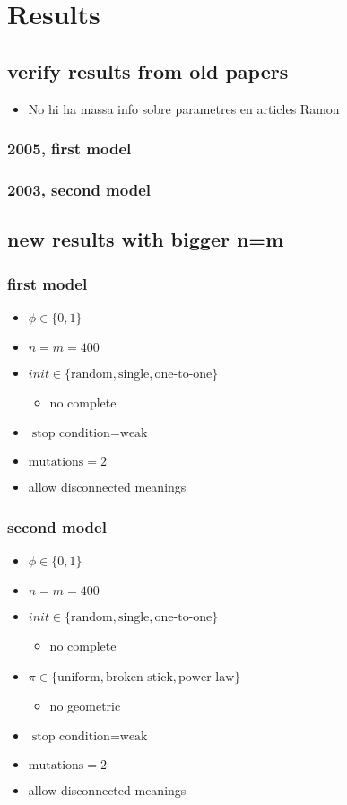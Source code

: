 \chapter{Results}
\section{verify results from old papers}
\begin{itemize}
\item No hi ha massa info sobre parametres en articles Ramon
\end{itemize}
\subsection{2005, first model}
\subsection{2003, second model}
\section{new results with bigger n=m}
\subsection{first model}
\begin{itemize}
\item $\phi \in \{0,1\}$
\item $n=m=400$
\item $init \in \{\text{random},\text{single},\text{one-to-one}\}$
  \begin{itemize}
  \item no complete
  \end{itemize}
\item $\text{stop condition} = \text{weak}$
\item $\text{mutations} = 2$
\item allow disconnected meanings
\end{itemize}
\subsection{second model}
\begin{itemize}
\item $\phi \in \{0,1\}$
\item $n=m=400$
\item $init \in \{\text{random},\text{single},\text{one-to-one}\}$
  \begin{itemize}
  \item no complete
  \end{itemize}
\item $\pi \in \{\text{uniform},\text{broken stick},\text{power law}\}$
  \begin{itemize}
  \item no geometric
  \end{itemize}
\item $\text{stop condition} = \text{weak}$
\item $\text{mutations} = 2$
\item allow disconnected meanings
\end{itemize}

